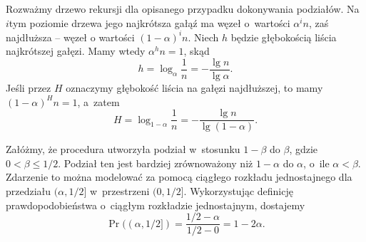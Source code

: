 \exercise %
Rozważmy drzewo rekursji dla opisanego przypadku dokonywania podziałów.
Na $i$\nbhyphen tym poziomie drzewa jego najkrótsza gałąź ma węzeł o~wartości $\alpha^in$, zaś najdłuższa -- węzeł o wartości $(1-\alpha)^in$.
Niech $h$ będzie głębokością liścia najkrótszej gałęzi.
Mamy wtedy $\alpha^hn=1$, skąd
\[
	h = \log_\alpha\frac{1}{n} = -\frac{\lg n}{\lg\alpha}.
\]
Jeśli przez $H$ oznaczymy głębokość liścia na gałęzi najdłuższej, to mamy $(1-\alpha)^Hn=1$, a~zatem
\[
	H = \log_{1-\alpha}\frac{1}{n} = -\frac{\lg n}{\lg(1-\alpha)}.
\]

\exercise %
Załóżmy, że procedura  utworzyła podział w~stosunku $1-\beta$ do $\beta$, gdzie $0<\beta\le1/2$.
Podział ten jest bardziej zrównoważony niż $1-\alpha$ do $\alpha$, o~ile $\alpha<\beta$.
Zdarzenie to można modelować za pomocą ciągłego rozkładu jednostajnego dla przedziału $(\alpha,1/2]$ w~przestrzeni $(0,1/2]$.
Wykorzystując definicję prawdopodobieństwa o~ciągłym rozkładzie jednostajnym, dostajemy
\[
	\Pr((\alpha,1/2]) = \frac{1/2-\alpha}{1/2-0} = 1-2\alpha.
\]
